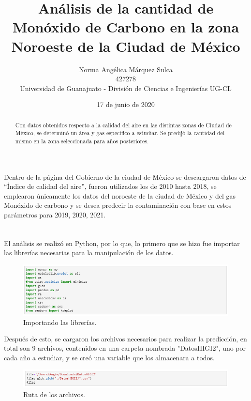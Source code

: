 \documentclass[12pt]{article}
\title{\textbf{\large{Análisis de la cantidad de Monóxido de Carbono en la zona Noroeste de la Ciudad de México}}}
\author{\normalsize Norma Angélica Márquez Sulca\\ 427278 \\\normalsize Universidad de Guanajuato - División de Ciencias e Ingenierías UG-CL\vspace{-1em}}
\date{\small{17 de junio de 2020}\vspace{1em}}
\begin{document}

    \maketitle %
        
      \begin{abstract} 
        Con datos obtenidos respecto a la calidad del aire en las distintas zonas de Ciudad de México, se determinó un área y gas específico a estudiar. Se predijó la cantidad del mismo en la zona seleccionada para años posteriores.
      \end{abstract}

\setlength{\topmargin}{0mm} %

\section{}
    Dentro de la página del Gobierno de la ciudad de México \cite{CDMX} se descargaron datos de “Índice de calidad del aire”, fueron utilizados los de 2010 hasta 2018, se emplearon únicamente los datos del noroeste de la ciudad de México y del gas Monóxido de carbono y se desea predecir la contaminación con base en estos parámetros para 2019, 2020, 2021.
 
\section{}
    El análisis se realizó en Python, por lo que, lo primero que se hizo fue importar las librerías necesarias para la manipulación de los datos.
         \begin{figure}[h] 
          \centering 
            \includegraphics[width=12cm]{Pred1.png}
                \caption{Importando las librerías.}
                \label{fig:1}
                 \end{figure}  
    
    Después de esto, se cargaron los archivos necesarios para realizar la predicción, en total son 9 archivos, contenidos en una carpeta nombrada "DatosHIGI2", uno por cada año a estudiar, y se creó una variable que los almacenara a todos.          
         \begin{figure}[h] 
          \centering 
            \includegraphics[width=12cm]{Pred2.png}
                \caption{Ruta de los archivos.}
                \label{fig:2}
                 \end{figure}  
        
\end{document}
